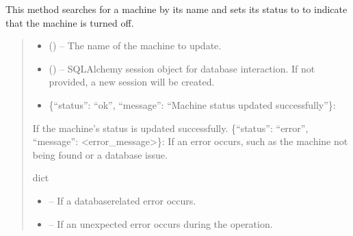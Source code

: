 \documentclass[letterpaper,10pt,english]{sphinxmanual}
\begin{document}
\begin{fulllineitems}
\begin{fulllineitems}
\sphinxAtStartPar
This method searches for a machine by its name and sets its  status to 
to indicate that the machine is turned off.
\begin{quote}\begin{description}
\begin{itemize}
\item {} 
\sphinxAtStartPar
{} () – The name of the machine to update.

\item {} 
\sphinxAtStartPar
{} (\sphinxstyleliteralemphasis{\sphinxupquote{, }}) – SQLAlchemy session object for database interaction.
If not provided, a new session will be created.

\end{itemize}

\sphinxAtStartPar
\begin{description}
\begin{itemize}
\item {} 
\sphinxAtStartPar
\{“status”: “ok”, “message”: “Machine status updated successfully”\}:

\end{itemize}

\sphinxAtStartPar
If the machine’s status is updated successfully.
\sphinxhyphen{} \{“status”: “error”, “message”: <error\_message>\}:
If an error occurs, such as the machine not being found or a database issue.

\end{description}


\sphinxAtStartPar
dict

\begin{itemize}
\item {} 
\sphinxAtStartPar
{} – If a database\sphinxhyphen{}related error occurs.

\item {} 
\sphinxAtStartPar
{} – If an unexpected error occurs during the operation.

\end{itemize}


\end{description}
\end{quote}
\end{fulllineitems}
\end{fulllineitems}
\end{document}
